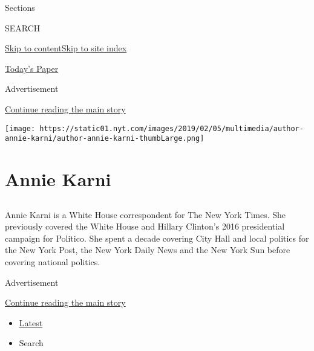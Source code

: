 Sections

SEARCH

\protect\hyperlink{site-content}{Skip to
content}\protect\hyperlink{site-index}{Skip to site index}

\href{https://myaccount.nytimes.com/auth/login?response_type=cookie\&client_id=vi}{}

\href{https://www.nytimes.com/section/todayspaper}{Today's Paper}

Advertisement

\protect\hyperlink{after-top}{Continue reading the main story}

\texttt{[image: https://static01.nyt.com/images/2019/02/05/multimedia/author-annie-karni/author-annie-karni-thumbLarge.png]}

\hypertarget{annie-karni}{%
\section{Annie Karni}\label{annie-karni}}

\subsection{}

Annie Karni is a White House correspondent for The New York Times. She
previously covered the White House and Hillary Clinton's 2016
presidential campaign for Politico. She spent a decade covering City
Hall and local politics for the New York Post, the New York Daily News
and the New York Sun before covering national politics.

Advertisement

\protect\hyperlink{after-mid1}{Continue reading the main story}

\begin{itemize}
\tightlist
\item
  \protect\hyperlink{stream-panel}{Latest}
\item
  Search
\end{itemize}

